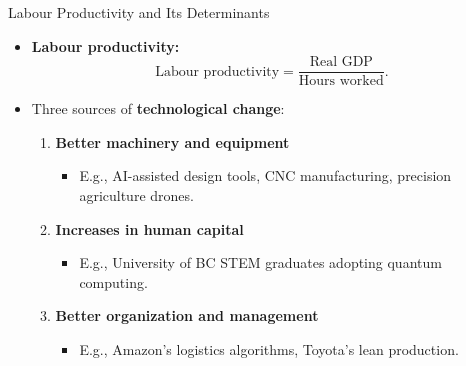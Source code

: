 \documentclass[aspectratio=169]{beamer}
\begin{document}
\begin{frame}{Labour Productivity and Its Determinants}
\transfade
\begin{itemize}
  \item \textbf{Labour productivity:}
  \[
    \text{Labour productivity} = \frac{\text{Real GDP}}{\text{Hours worked}}.
  \]
  \item Three sources of \textbf{technological change}:
  \begin{enumerate}
    \item \textbf{Better machinery and equipment}
    \begin{itemize}
      \item E.g., AI-assisted design tools, CNC manufacturing, precision agriculture drones.
    \end{itemize}
    \item \textbf{Increases in human capital}
    \begin{itemize}
      \item E.g., University of BC STEM graduates adopting quantum computing.
    \end{itemize}
    \item \textbf{Better organization and management}
    \begin{itemize}
      \item E.g., Amazon's logistics algorithms, Toyota's lean production.
    \end{itemize}
  \end{enumerate}
\end{itemize}
\end{frame}
\end{document}
